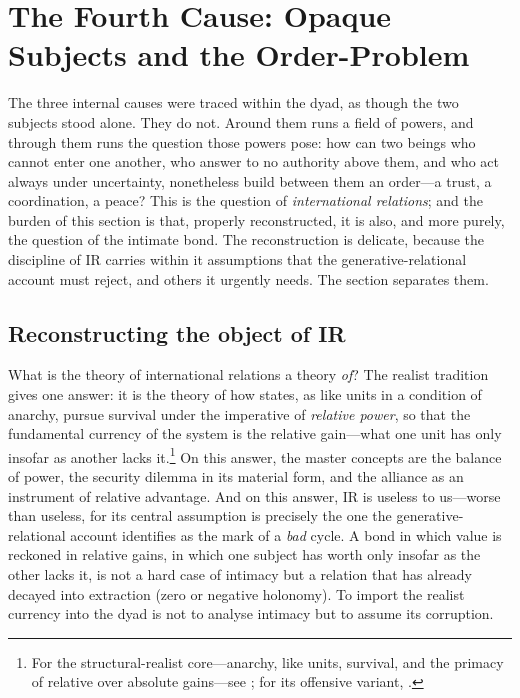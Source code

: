 \section{The Fourth Cause: Opaque Subjects and the Order-Problem}
\label{p17:sec:ir}

\noindent
The three internal causes were traced within the dyad, as though the two subjects stood alone. They do not. Around them runs a field of powers, and through them runs the question those powers pose: how can two beings who cannot enter one another, who answer to no authority above them, and who act always under uncertainty, nonetheless build between them an order---a trust, a coordination, a peace? This is the question of \emph{international relations}; and the burden of this section is that, properly reconstructed, it is also, and more purely, the question of the intimate bond. The reconstruction is delicate, because the discipline of IR carries within it assumptions that the generative-relational account must reject, and others it urgently needs. The section separates them.

\subsection{Reconstructing the object of IR}
\label{p17:sub:ir-redefine}

What is the theory of international relations a theory \emph{of}? The realist tradition gives one answer: it is the theory of how states, as like units in a condition of anarchy, pursue survival under the imperative of \emph{relative power}, so that the fundamental currency of the system is the relative gain---what one unit has only insofar as another lacks it.\footnote{For the structural-realist core---anarchy, like units, survival, and the primacy of relative over absolute gains---see \textcite{waltz1979}; for its offensive variant, \textcite{mearsheimer2001}.} On this answer, the master concepts are the balance of power, the security dilemma in its material form, and the alliance as an instrument of relative advantage. And on this answer, IR is useless to us---worse than useless, for its central assumption is precisely the one the generative-relational account identifies as the mark of a \emph{bad} cycle. A bond in which value is reckoned in relative gains, in which one subject has worth only insofar as the other lacks it, is not a hard case of intimacy but a relation that has already decayed into extraction (zero or negative holonomy). To import the realist currency into the dyad is not to analyse intimacy but to assume its corruption.

